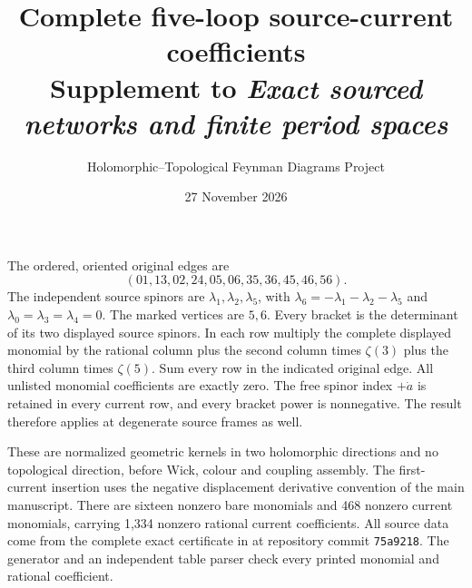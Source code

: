 \documentclass[10pt,a4paper]{article}
\title{Complete five-loop source-current coefficients\\
\large Supplement to \emph{Exact sourced networks and finite period spaces}}
\author{Holomorphic--Topological Feynman Diagrams Project}
\date{27 November 2026}
\begin{document}
\maketitle
The ordered, oriented original edges are
\[
(01,13,02,24,05,06,35,36,45,46,56).
\]
The independent source spinors are $\lambda_1,\lambda_2,\lambda_5$,
with $\lambda_6=-\lambda_1-\lambda_2-\lambda_5$ and
$\lambda_0=\lambda_3=\lambda_4=0$. The marked vertices are $5,6$.
Every bracket is the determinant of its two displayed source spinors.
In each row multiply the complete displayed monomial by the rational
column plus the second column times $\zeta(3)$ plus the third column
times $\zeta(5)$. Sum every row in the indicated original edge.
All unlisted monomial coefficients are exactly zero. The free spinor
index $+\dot a$ is retained in every current row, and every bracket
power is nonnegative. The result therefore applies at degenerate source
frames as well.

These are normalized geometric kernels in two holomorphic directions
and no topological direction, before Wick, colour and coupling
assembly. The first-current insertion uses the negative displacement
derivative convention of the main manuscript. There are sixteen
nonzero bare monomials and 468 nonzero current monomials, carrying
1,334 nonzero rational current coefficients. All source data come from
the complete exact certificate in
at repository commit \texttt{75a9218}. The generator and an independent
table parser check every printed monomial and rational coefficient.
\tableofcontents
\clearpage
\small

\end{document}
